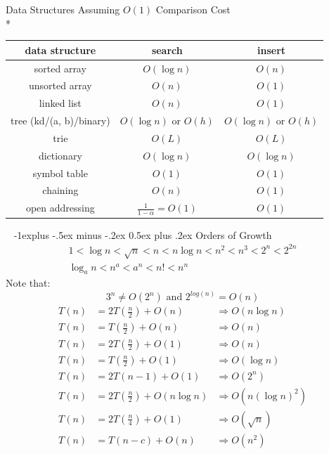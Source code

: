 \documentclass[10pt, landscape]{article}
\makeatletter
\newenvironment{tightcenter}{%
  \setlength\topsep{0pt}
  \setlength\parskip{0pt}
  \begin{center}
}{%
  \end{center}
}
\renewcommand{\subsection}{\@startsection{subsection}{2}{0mm}%
                                {-1explus -.5ex minus -.2ex}%
                                {0.5ex plus .2ex}%
                                {\normalfont\normalsize\bfseries}}
\makeatother
\begin{document}
\begin{multicols}{2}
\begin{tightcenter}
        \vspace{5pt}
        Data Structures Assuming $O(1)$ Comparison Cost
        \\* \begin{tabular}{| c | c | c |}\hline
            \textbf{data structure} & \textbf{search} & \textbf{insert}\\\hline
            sorted array & $O(\log n)$ & $O(n)$ \\\hline
            unsorted array & $O(n)$ & $O(1)$ \\\hline
            linked list & $O(n)$ & $O(1)$ \\\hline
            tree (kd/(a, b)/binary) & $O(\log n)$ or $O(h)$ & $O(\log n)$ or $O(h)$ \\\hline
            trie & $O(L)$ & $O(L)$ \\\hline
            dictionary & $O(\log n)$ & $O(\log n)$ \\\hline
            symbol table & $O(1)$ & $O(1)$ \\\hline
            chaining & $O(n)$ & $O(1)$ \\\hline
            open addressing & $\frac{1}{1-\alpha} = O(1)$ & $O(1)$ \\\hline
        \end{tabular}

        \ 
        \subsection{Orders of Growth}
        \begin{gather*}
            1 < \log n < \sqrt{n} < n < n \log n < n^2 < n^3 < 2^n < 2^{2n} \\
            \log_a n < n^a < a^n < n! < n^n
        \end{gather*}
        Note that:
        \begin{equation*}
            3^n \neq O(2^n) \text{ and } 2^{log(n)} = O(n)
        \end{equation*}
        \begin{align*}
            T(n) &= 2T(\frac{n}{2}) + O(n) &\Rightarrow O(n \log n)
            \\ T(n) &= T(\frac{n}{2}) + O(n) &\Rightarrow O(n)
            \\ T(n) &= 2T(\frac{n}{2}) + O(1) &\Rightarrow O(n)
            \\ T(n) &= T(\frac{n}{2}) + O(1) &\Rightarrow O(\log n)
            \\ T(n) &= 2T(n - 1) + O(1) &\Rightarrow O(2^n)
            \\ T(n) &= 2T(\frac{n}{2}) + O(n \log n) &\Rightarrow O(n(\log n)^2)
            \\ T(n) &= 2T(\frac{n}{4}) + O(1) &\Rightarrow O(\sqrt{n})
            \\ T(n) &= T(n - c) + O(n) &\Rightarrow O(n^2)
        \end{align*}
    \end{tightcenter}
\end{multicols}
\end{document}
